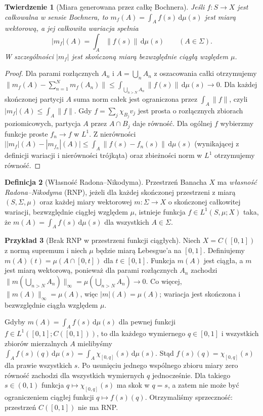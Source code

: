 \documentclass[11pt,a4paper]{article}
\numberwithin{equation}{section}
\theoremstyle{plain}
\newtheorem{twierdzenie}{Twierdzenie}[section]
\theoremstyle{definition}
\newtheorem{definicja}[twierdzenie]{Definicja}
\newtheorem{przyklad}[twierdzenie]{Przykład}
\theoremstyle{remark}
\begin{document}
\begin{twierdzenie}[Miara generowana przez całkę Bochnera]
\label{thm:bochner-measure15b}
Jeśli $f:S\to X$ jest całkowalna w sensie Bochnera, to
$m_f(A)=\int_Af(s)\,\mathrm d\mu(s)$ jest miarą wektorową,
a jej całkowita wariacja spełnia
\[
 |m_f|(A)=\int_A\|f(s)\|\,\mathrm d\mu(s)
 \qquad(A\in\Sigma).
\]
W szczególności $|m_f|$ jest skończoną miarą bezwzględnie
ciągłą względem $\mu$.
\end{twierdzenie}
\begin{proof}
Dla parami rozłącznych $A_n$ i $A=\bigcup_nA_n$
z oszacowania całki otrzymujemy
$\|m_f(A)-\sum_{n=1}^Nm_f(A_n)\|
\le\int_{\bigcup_{n>N}A_n}\|f(s)\|\,\mathrm d\mu(s)\to0$.
Dla każdej skończonej partycji $A$ suma norm całek
jest ograniczona przez $\int_A\|f\|$, czyli
$|m_f|(A)\le\int_A\|f\|$.
Gdy $f=\sum_j\chi_{B_j}v_j$ jest prosta o rozłącznych
zbiorach poziomicowych, partycja $A$ przez $A\cap B_j$
daje równość. Dla ogólnej $f$ wybierzmy funkcje proste
$f_n\to f$ w $L^1$. Z nierówności
$\bigl||m_f|(A)-|m_{f_n}|(A)\bigr|
\le\int_A\|f(s)-f_n(s)\|\,\mathrm d\mu(s)$
(wynikającej z definicji wariacji i nierówności trójkąta)
oraz zbieżności norm w $L^1$ otrzymujemy równość.
\end{proof}

\begin{definicja}[Własność Radona--Nikodyma]
\label{def:rnp15b}
Przestrzeń Banacha $X$ ma \emph{własność Radona--Nikodyma}
(RNP), jeżeli dla każdej skończonej przestrzeni z miarą
$(S,\Sigma,\mu)$ oraz każdej miary wektorowej
$m:\Sigma\to X$ o skończonej całkowitej wariacji,
bezwzględnie ciągłej względem $\mu$, istnieje funkcja
$f\in L^1(S,\mu;X)$ taka, że
$m(A)=\int_Af(s)\,\mathrm d\mu(s)$ dla wszystkich $A\in\Sigma$.
\end{definicja}

\begin{przyklad}[Brak RNP w przestrzeni funkcji ciągłych]
\label{ex:rnp-counterexample15b}
Niech $X=C([0,1])$ z normą supremum i niech $\mu$ będzie
miarą Lebesgue'a na $[0,1]$. Definiujemy
$m(A)(t)=\mu(A\cap[0,t])$ dla $t\in[0,1]$.
Funkcja $m(A)$ jest ciągła, a $m$ jest miarą wektorową,
ponieważ dla parami rozłącznych $A_n$ zachodzi
$\|m(\bigcup_{n>N}A_n)\|_\infty
=\mu(\bigcup_{n>N}A_n)\to0$.
Co więcej, $\|m(A)\|_\infty=\mu(A)$, więc
$|m|(A)=\mu(A)$; wariacja jest skończona i
bezwzględnie ciągła względem $\mu$.

Gdyby $m(A)=\int_Af(s)\,\mathrm d\mu(s)$ dla pewnej funkcji
$f\in L^1([0,1];C([0,1]))$, to dla każdego wymiernego
$q\in[0,1]$ i wszystkich zbiorów mierzalnych $A$
mielibyśmy
$\int_A f(s)(q)\,\mathrm d\mu(s)
=\int_A\chi_{[0,q]}(s)\,\mathrm d\mu(s)$.
Stąd $f(s)(q)=\chi_{[0,q]}(s)$ dla prawie wszystkich $s$.
Po usunięciu jednego wspólnego zbioru miary zero równość
zachodzi dla wszystkich wymiernych $q$ jednocześnie.
Dla takiego $s\in(0,1)$ funkcja
$q\mapsto\chi_{[0,q]}(s)$ ma skok w $q=s$, a zatem
nie może być ograniczeniem ciągłej funkcji $q\mapsto f(s)(q)$.
Otrzymaliśmy sprzeczność: przestrzeń $C([0,1])$ nie ma RNP.
\end{przyklad}
\end{document}
